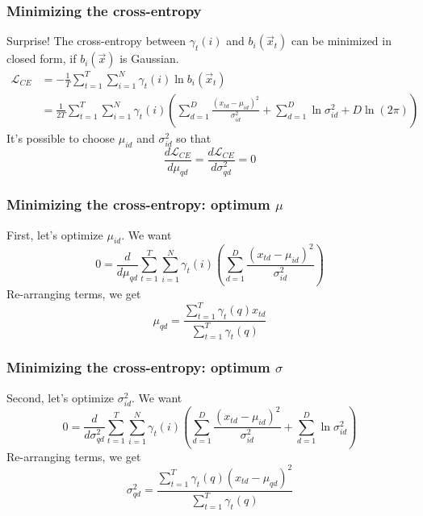 \documentclass{beamer}
\begin{document}
\begin{frame}
  \frametitle{Minimizing the cross-entropy}

  Surprise!  The cross-entropy between $\gamma_t(i)$ and
  $b_i(\vec{x}_t)$ can be minimized in closed form, if $b_i(\vec{x})$
  is Gaussian.
  \begin{align*}
    {\mathcal L}_{CE}
    &= -\frac{1}{T}\sum_{t=1}^T\sum_{i=1}^N\gamma_t(i)\ln b_i(\vec{x}_t)\\
    &= \frac{1}{2T}\sum_{t=1}^T\sum_{i=1}^N\gamma_t(i)\left(
    \sum_{d=1}^D\frac{(x_{td}-\mu_{id})^2}{\sigma_{id}^2}
    +\sum_{d=1}^D\ln\sigma_{id}^2
    +D\ln(2\pi)\right)
  \end{align*}
  It's possible to choose $\mu_{id}$ and $\sigma_{id}^2$ so that
  \begin{displaymath}
    \frac{d{\mathcal L}_{CE}}{d\mu_{qd}}=
    \frac{d{\mathcal L}_{CE}}{d\sigma_{qd}^2}=0
  \end{displaymath}
\end{frame}
  
\begin{frame}
  \frametitle{Minimizing the cross-entropy: optimum $\mu$}

  First, let's optimize $\mu_{id}$.  We want
  \begin{displaymath}
    0 = \frac{d}{d\mu_{qd}}\sum_{t=1}^T\sum_{i=1}^N\gamma_t(i)\left(\sum_{d=1}^D\frac{(x_{td}-\mu_{id})^2}{\sigma_{id}^2}\right)
  \end{displaymath}
  Re-arranging terms, we get
  \begin{displaymath}
    \mu_{qd} = \frac{\sum_{t=1}^T\gamma_t(q)x_{td}}{\sum_{t=1}^T\gamma_t(q)}
  \end{displaymath}
\end{frame}

\begin{frame}
  \frametitle{Minimizing the cross-entropy: optimum $\sigma$}

  Second, let's optimize $\sigma_{id}^2$.  We want
  \begin{displaymath}
    0 = \frac{d}{d\sigma_{qd}^2}\sum_{t=1}^T\sum_{i=1}^N\gamma_t(i)\left(
    \sum_{d=1}^D\frac{(x_{td}-\mu_{id})^2}{\sigma_{id}^2}    +\sum_{d=1}^D\ln\sigma_{id}^2\right)
  \end{displaymath}
  Re-arranging terms, we get
  \begin{displaymath}
    \sigma_{qd}^2 = \frac{\sum_{t=1}^T\gamma_t(q)(x_{td}-\mu_{qd})^2}{\sum_{t=1}^T\gamma_t(q)}
  \end{displaymath}
\end{frame}
\end{document}
